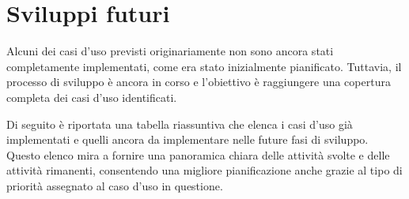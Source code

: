 \section{Sviluppi futuri}
Alcuni dei casi d'uso previsti originariamente 
non sono ancora stati completamente implementati, come era stato 
inizialmente pianificato. Tuttavia, il processo di sviluppo 
è ancora in corso e l'obiettivo è raggiungere una copertura 
completa dei casi d'uso identificati.

Di seguito è riportata una tabella riassuntiva che elenca 
i casi d'uso già implementati e quelli ancora da implementare 
nelle future fasi di sviluppo. Questo elenco mira a fornire 
una panoramica chiara delle attività svolte e delle attività 
rimanenti, consentendo una migliore pianificazione anche grazie al tipo
di priorità assegnato al caso d'uso in questione.

\newpage

